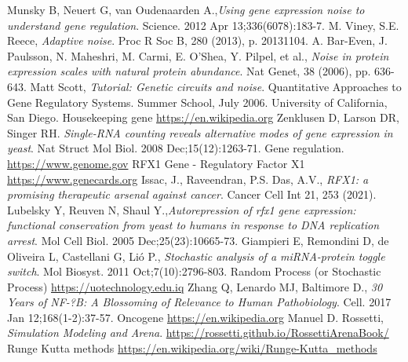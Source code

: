 \documentclass[12pt,a4paper]{report}
\begin{document}
\begin{thebibliography}{bibliography}
     Munsky B, Neuert G, van Oudenaarden A.,{\em Using gene expression noise to understand gene regulation}. Science. 2012 Apr 13;336(6078):183-7. 
     M. Viney, S.E. Reece, {\em Adaptive noise}. Proc R Soc B, 280 (2013), p. 20131104.
     A. Bar-Even, J. Paulsson, N. Maheshri, M. Carmi, E. O'Shea, Y. Pilpel, et al., {\em Noise in protein expression scales with natural protein abundance}. Nat Genet, 38 (2006), pp. 636-643.
     Matt Scott, {\em Tutorial: Genetic circuits and noise}. Quantitative Approaches to Gene Regulatory Systems. Summer School, July 2006. University of California, San Diego.
     Housekeeping gene \href{https://en.wikipedia.org/wiki/Housekeeping_gene}{https://en.wikipedia.org}
     Zenklusen D, Larson DR, Singer RH. {\em Single-RNA counting reveals alternative modes of gene expression in yeast}. Nat Struct Mol Biol. 2008 Dec;15(12):1263-71. 
     Gene regulation. \href{https://www.genome.gov/genetics-glossary/Gene-Regulation}{https://www.genome.gov}
     RFX1 Gene - Regulatory Factor X1 \href{https://www.genecards.org/cgi-bin/carddisp.pl?gene=RFX1}{https://www.genecards.org}
    Issac, J., Raveendran, P.S. Das, A.V., {\em RFX1: a promising therapeutic arsenal against cancer}. Cancer Cell Int 21, 253 (2021). 
    Lubelsky Y, Reuven N, Shaul Y.,{\em Autorepression of rfx1 gene expression: functional conservation from yeast to humans in response to DNA replication arrest}. Mol Cell Biol. 2005 Dec;25(23):10665-73.
     Giampieri E, Remondini D, de Oliveira L, Castellani G, Li\'o P., {\em Stochastic analysis of a miRNA-protein toggle switch}. Mol Biosyst. 2011 Oct;7(10):2796-803.
     Random Process (or Stochastic Process) \href{https://uotechnology.edu.iq/dep/coe/lectures/dr-THAMER/Probability%20&%20Statistics/ch%203.pdf}{https://uotechnology.edu.iq}
     Zhang Q, Lenardo MJ, Baltimore D., {\em 30 Years of NF-?B: A Blossoming of Relevance to Human Pathobiology}. Cell. 2017 Jan 12;168(1-2):37-57.
     Oncogene \href{https://en.wikipedia.org/wiki/Oncogene}{https://en.wikipedia.org}
     Manuel D. Rossetti, {\em Simulation Modeling and Arena}. \url{https://rossetti.github.io/RossettiArenaBook/}
     Runge Kutta methods \url{https://en.wikipedia.org/wiki/Runge-Kutta_methods}

\end{thebibliography}
\end{document}

